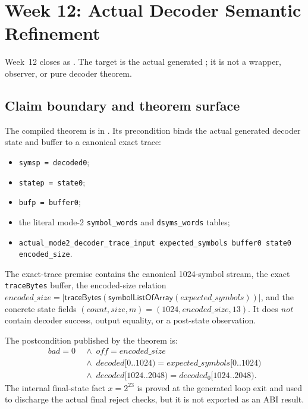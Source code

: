 \section{Week 12: Actual Decoder Semantic Refinement}

Week~12 closes  as
.  The target is the actual
generated ; it is not a wrapper,
observer, or pure decoder theorem.

\subsection*{Claim boundary and theorem surface}

The compiled theorem is
 in
.  Its precondition binds the actual
generated decoder state and buffer to a canonical exact trace:
\begin{itemize}
  \item \texttt{symsp = decoded0};
  \item \texttt{statep = state0};
  \item \texttt{bufp = buffer0};
  \item the literal mode-2 \texttt{symbol\_words} and \texttt{dsyms\_words}
        tables;
  \item \texttt{actual\_mode2\_decoder\_trace\_input expected\_symbols
        buffer0 state0 encoded\_size}.
\end{itemize}
The exact-trace premise contains the canonical 1024-symbol stream, the exact
\texttt{traceBytes} buffer, the encoded-size relation
\(\mathit{encoded\_size} = |\mathsf{traceBytes}(\mathsf{symbolListOfArray}
(expected\_symbols))|\), and the concrete state fields
\((count,size,m)=(1024,encoded\_size,13)\).  It does \emph{not} contain
decoder success, output equality, or a post-state observation.

The postcondition published by the theorem is:
\[
\begin{aligned}
  bad=0
  &\;\land\; off=\mathit{encoded\_size} \\
  &\;\land\; decoded[0..1024)=expected\_symbols[0..1024) \\
  &\;\land\; decoded[1024..2048)=decoded_0[1024..2048).
\end{aligned}
\]
The internal final-state fact \(x=2^{23}\) is proved at the generated loop
exit and used to discharge the actual final reject checks, but it is not
exported as an ABI result.

